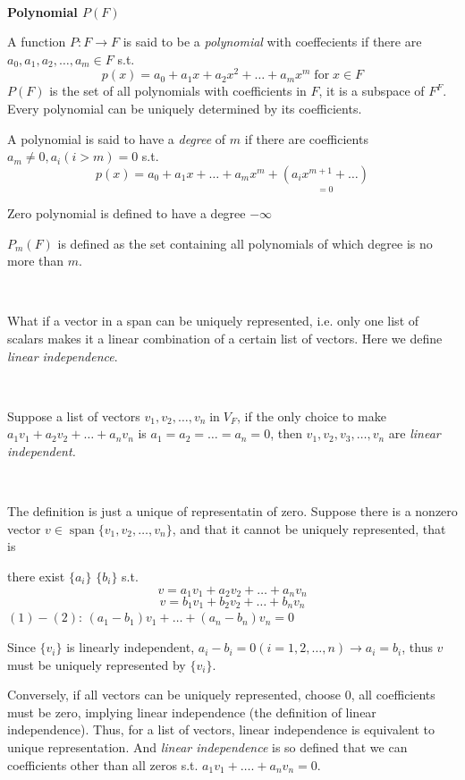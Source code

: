 \documentclass{amsart}
\newcommand{\tmem}[1]{{\em #1\/}}
\newcommand{\tmop}[1]{\ensuremath{\operatorname{#1}}}
\newcommand{\tmstrong}[1]{\textbf{#1}}
\begin{document}
\

{\tmstrong{Polynomial $P (F)$}}

A function $P : F \rightarrow F$ is said to be a {\tmem{po{\tmem{}}lynomial}}
with coeffecients if there are $a_0, a_1, a_2, \ldots, a_m \in F$ s.t.
\[ p (x) = a_0 + a_1 x + a_2 x^2 + \ldots + a_m x^m \tmop{for} x \in F \]
$P (F)$ is the set of all polynomials with coefficients in $F$, it is a
subspace of $F^F$. Every polynomial can be uniquely determined by its
coefficients.

A polynomial is said to have a {\tmem{degree}} of $m$ if there are
coefficients $a_m \neq 0, a_i (i > m) = 0$ s.t.
\[ p (x) = a_0 + a_1 x + \ldots + a_m x^m + \underset{= 0}{(a_i x^{m + 1} +
   \ldots)} \]


Zero polynomial is defined to have a degree $- \infty$

$P_m (F)$ is defined as the set containing all polynomials of which degree is
no more than $m$.

\

What if a vector in a span can be uniquely represented, i.e. only one list of
scalars makes it a linear combination of a certain list of vectors. Here we
define {\tmem{linear independence}}.

\

Suppose a list of vectors $v_1, v_2, \ldots, v_n \tmop{in} V_F$, if the only
choice to make $a_1 v_1 + a_2 v_2 + \ldots + a_n v_n$ is $a_1 = a_2 = \ldots =
a_n = 0$, then $v_1, v_2, v_3, \ldots, v_n$ are {\tmem{linear independent.}}

\

The definition is just a unique of representatin of zero. Suppose there is a
nonzero vector $v \in \tmop{span} \{ v_1, v_2, \ldots, v_n \}$, and that it
cannot be uniquely represented, that is

there exist $\{ a_i \}$ $\{ b_i \}$ s.t.
\begin{equation}
  v = a_1 v_1 + a_2 v_2 + \ldots + a_n v_n
\end{equation}
\begin{equation}
  v = b_1 v_1 + b_2 v_2 + \ldots + b_n v_n
\end{equation}
$(1) - (2)$: $(a_1 - b_1) v_1 + \ldots + (a_n - b_n) v_n = 0$

Since $\{ v_i \}$ is linearly independent, $a_i - b_i = 0 (i = 1, 2, \ldots,
n) \rightarrow a_i = b_i$, thus $v$ must be uniquely represented by $\{ v_i
\}$.

Conversely, if all vectors can be uniquely represented, choose $0$, all
coefficients must be zero, implying linear independence (the definition of
linear independence). Thus, for a list of vectors, linear independence is
equivalent to unique representation. And {\tmem{linear independence}} is so
defined that we can coefficients other than all zeros s.t. $a_1 v_1 + \ldots .
+ a_n v_n = 0$.
\end{document}
